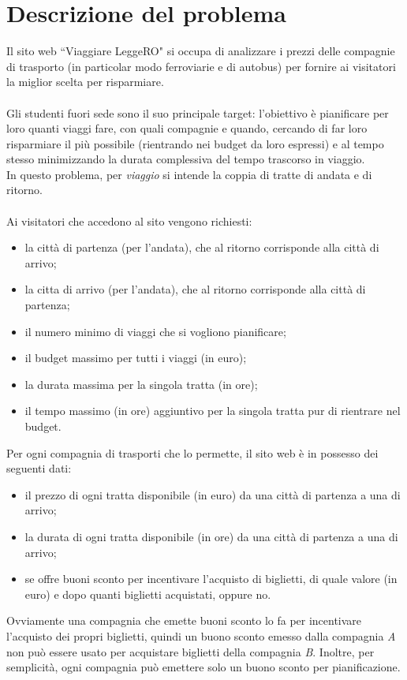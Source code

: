 \documentclass[main.tex]{subfiles}
\begin{document}
\section{Descrizione del problema}
Il sito web ``Viaggiare LeggeRO" si occupa di analizzare i prezzi delle compagnie di trasporto (in particolar modo ferroviarie e di autobus) per fornire
ai visitatori la miglior scelta per risparmiare.\\ \\
Gli studenti fuori sede sono il suo principale target: l'obiettivo è pianificare per loro quanti viaggi fare, con quali compagnie e quando, cercando di far loro
risparmiare il più possibile (rientrando nei budget da loro espressi) e al tempo stesso minimizzando la durata complessiva del tempo trascorso in viaggio.\\
In questo problema, per \textit{viaggio} si intende la coppia di tratte di andata e di ritorno.\\ \\
Ai visitatori che accedono al sito vengono richiesti:
\begin{itemize}
    \item la città di partenza (per l'andata), che al ritorno corrisponde alla città di arrivo;
    \item la citta di arrivo (per l'andata), che al ritorno corrisponde alla città di partenza;
    \item il numero minimo di viaggi che si vogliono pianificare;
    \item il budget massimo per tutti i viaggi (in euro);
    \item la durata massima per la singola tratta (in ore);
    \item il tempo massimo (in ore) aggiuntivo per la singola tratta pur di rientrare nel budget.
\end{itemize}

Per ogni compagnia di trasporti che lo permette, il sito web è in possesso dei seguenti dati:
\begin{itemize}
    \item il prezzo di ogni tratta disponibile (in euro) da una città di partenza a una di arrivo;
    \item la durata di ogni tratta disponibile (in ore)  da una città di partenza a una di arrivo;
    \item se offre buoni sconto per incentivare l'acquisto di biglietti, di quale valore (in euro) e dopo quanti biglietti acquistati, oppure no.
\end{itemize}
Ovviamente una compagnia che emette buoni sconto lo fa per incentivare l'acquisto dei propri biglietti, quindi un buono sconto emesso dalla compagnia \textit{A} non può essere usato per acquistare biglietti della compagnia \textit{B}.
Inoltre, per semplicità, ogni compagnia può emettere solo un buono sconto per pianificazione.
\end{document}
